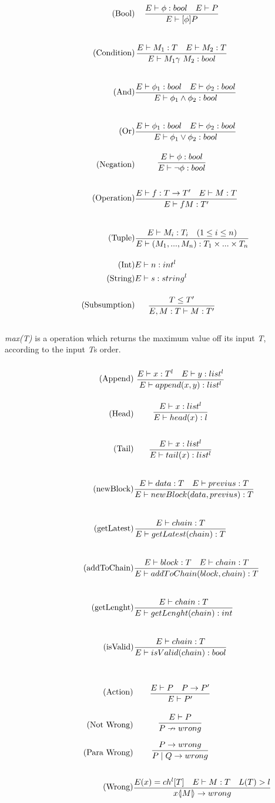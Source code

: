 \begin{align}
\tag{Bool} &\infrule{E\vdash \phi:bool\quad E\vdash P}{E \vdash [\phi] P}\\
\tag{Condition} &\infrule{E\vdash M_1:T \quad E\vdash M_2:T}{E\vdash M_1 \gamma\ M_2:bool}\\
\tag{And} &\infrule{E\vdash \phi _1:bool \quad E\vdash \phi _2:bool}{E\vdash \phi _1 \land \phi _2:bool}\\
\tag{Or} &\infrule{E\vdash \phi _1:bool \quad E\vdash \phi _2:bool}{E\vdash \phi _1 \lor \phi _2:bool}\\
\tag{Negation} &\infrule{E\vdash \phi :bool }{E\vdash \neg \phi :bool}\\
\tag{Operation} &\infrule{E\vdash f:T\ra T'\quad E\vdash M:T}{E\vdash fM:T'}\\
\tag{Tuple} &\infrule{E\vdash M_i:T_i \quad (1\leq i\leq n)}{E\vdash (M_1,...,M_n):T_1\times ...\times T_n}\\
\tag{Int} &E\vdash n: int^l\\
\tag{String} &E\vdash s:string^l\\
\tag{Subsumption} &\infrule{T\leq T'}{E, M:T\vdash M:T'}
\end{align}


\textit{max(T)} is a operation which returns the maximum value off its input \textit{T}, according to the input \textit{T}s order.
\begin{align}
\tag{Append} &\infrule{E \vdash x:T^l \quad E \vdash y:list^l}{E \vdash append(x,y):list^l}\\
\tag{Head} &\infrule{E \vdash x:list^l}{E \vdash head(x):l}\\
\tag{Tail} &\infrule{E \vdash x:list^l}{E \vdash tail(x):list^l}\\
\tag{newBlock}& \infrule{E \vdash data:T \quad E \vdash previus : T}{E \vdash newBlock(data, previus) :T}\\
\tag{getLatest}& \infrule{E \vdash chain :T}{E \vdash getLatest(chain):T}\\
\tag{addToChain}& \infrule{E \vdash block:T \quad E \vdash chain:T}{E \vdash addToChain(block, chain):T}\\
\tag{getLenght}& \infrule{E \vdash chain:T}{E \vdash getLenght(chain):int}\\
\tag{isValid}& \infrule{E \vdash chain:T}{E \vdash isValid(chain):bool}
\end{align}

\begin{align}
\tag{Action} & \infrule{E \vdash P \quad P\ra P'}{E\vdash P'}\\
\tag{Not Wrong}& \infrule{E \vdash P}{P \nrightarrow wrong}\\
\tag{Para Wrong}& \infrule{P \ra wrong}{P\para Q \ra wrong}\\
\tag{Wrong}& \infrule{E(x) = ch^l[T] \quad E \vdash M:T \quad L(T) > l }{\lift{x}{M} \ra wrong}\\
\end{align}



